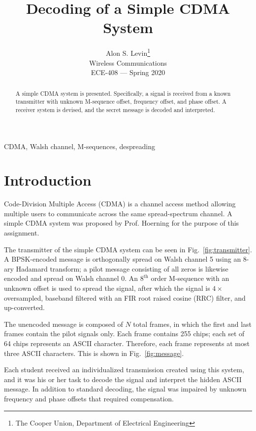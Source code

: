 \documentclass[journal]{IEEEtran}
\begin{document}
\title{Decoding of a Simple CDMA System}
\author{Alon S. Levin\thanks{The Cooper Union, Department of Electrical Engineering}\\Wireless Communications\\ECE-408 --- Spring 2020}
\maketitle

\begin{abstract}
A simple CDMA system is presented. Specifically, a signal is received from a known transmitter with unknown M-sequence offset, frequency offset, and phase offset. A receiver system is devised, and the secret message is decoded and interpreted.
\end{abstract}

\begin{IEEEkeywords}
CDMA, Walsh channel, M-sequences, despreading
\end{IEEEkeywords}

\section{Introduction}\label{sec:intro}
Code-Division Multiple Access (CDMA) is a channel access method allowing multiple users to communicate across the same spread-spectrum channel. A simple CDMA system was proposed by Prof. Hoerning for the purpose of this assignment.

The transmitter of the simple CDMA system can be seen in Fig.~\ref{fig:transmitter}. A BPSK-encoded message is orthogonally spread on Walsh channel 5 using an 8-ary Hadamard transform; a pilot message consisting of all zeros is likewise encoded and spread on Walsh channel 0. An $8^{\text{th}}$ order M-sequence with an unknown offset is used to spread the signal, after which the signal is $4\times$ oversampled, baseband filtered with an FIR root raised cosine (RRC) filter, and up-converted.

The unencoded message is composed of $N$ total frames, in which the first and last frames contain the pilot signals only. Each frame contains 255 chips; each set of 64 chips represents an ASCII character. Therefore, each frame represents at most three ASCII characters. This is shown in Fig.~\ref{fig:message}.

Each student received an individualized transmission created using this system, and it was his or her task to decode the signal and interpret the hidden ASCII message. In addition to standard decoding, the signal was impaired by unknown frequency and phase offsets that required compensation.
\end{document}
